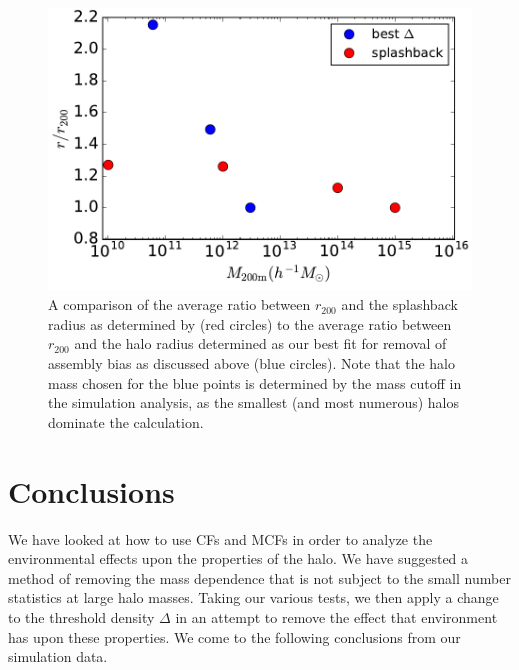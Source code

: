 \documentclass[usenatbib,fleqn]{mnras}
\begin{document}
\begin{figure}
	\centering
	\includegraphics[width=.4\textwidth]{test_splashback.pdf}
	\caption{A comparison of the average ratio between $r_{200}$ and the splashback radius as determined by
	 \citet{more_etal15} (red circles) to the average ratio between $r_{200}$ and the halo radius determined as our
	  best fit for removal of assembly bias as discussed above (blue circles). Note that the halo mass chosen for
	  the blue points is determined by the mass cutoff in the simulation analysis, as the smallest (and most
	  numerous) halos dominate the calculation.}
	\label{fig:splashback_compare}
\end{figure}

\section[]{Conclusions}
\label{section:conclusions}

We have looked at how to use CFs and MCFs in order to analyze the environmental effects upon the properties of the halo. We have suggested a method of removing the mass dependence that is not subject to the small number statistics at large halo masses. Taking our various tests, we then apply a change to the threshold density $\Delta$ in an attempt to remove the effect that environment has upon these properties. We come to the following conclusions from our simulation data.
\end{document}
